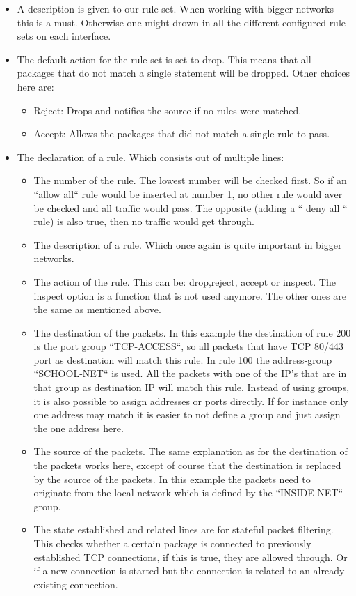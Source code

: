 \begin{itemize}
\item A description is given to our rule-set. When working with bigger networks this is a must. Otherwise one might drown in all the different configured rule-sets on each interface.
\item The default action for the rule-set is set to drop. This means that all packages that do not match a single statement will be dropped. Other choices here are:
\begin{itemize}
\item Reject: Drops and notifies the source if no rules were matched.
\item Accept: Allows the packages that did not match a single rule to pass.
\end{itemize}
\item The declaration of a rule. Which consists out of multiple lines:
\begin{itemize}
\item The number of the rule. The lowest number will be checked first. So if an ``allow all`` rule would be inserted at number 1, no other rule would aver be checked and all traffic would pass. The opposite (adding a `` deny all `` rule) is also true, then no traffic would get through.
\item The description of a rule. Which once again is quite important in bigger networks.
\item The action of the rule. This can be: drop,reject, accept or inspect. The inspect option is a function that is not used anymore. The other ones are the same as mentioned above.
\item The destination of the packets. In this example the destination of rule 200 is the port group ``TCP-ACCESS``, so all packets that have TCP 80/443 port as destination will match this rule. In rule 100 the address-group ``SCHOOL-NET`` is used. All the packets with one of the IP's that are in that group as destination IP will match this rule. Instead of using groups, it is also possible to assign addresses or ports directly. If for instance only one address may match it is easier to not define a group and just assign the one address here.
\item The source of the packets. The same explanation as for the destination of the packets works here, except of course that the destination is replaced by the source of the packets. In this example the packets need to originate from the local network which is defined by the ``INSIDE-NET`` group.
\item The state established and related lines are for stateful packet filtering. This checks whether a certain package is connected to previously established TCP connections, if this is true, they are allowed through. Or if a new connection is started but the connection is related to an already existing connection.
\end{itemize}
\end{itemize}
